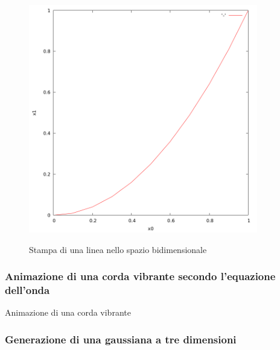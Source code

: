 \documentclass{article}
\begin{document}
\begin{figure}[H] 
\begin{center}  
  \includegraphics[width=10cm]{test_gnuplot-curve.png}\\ 
  \caption{Stampa di una linea nello spazio bidimensionale} 
\end{center} 
\end{figure}

\subsubsection{Animazione di una corda vibrante secondo l'equazione dell'onda}

\begin{frame}{Animazione di una corda vibrante}
\end{frame}

\subsubsection{Generazione di una gaussiana a tre dimensioni}
\end{document}
